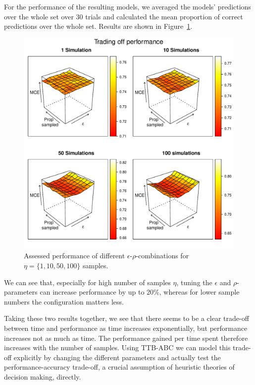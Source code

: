 \documentclass[a4paper,man, natbib]{apa6}
\begin{document}
For the performance of the resulting models, we averaged the models' predictions over the whole set over 30 trials and calculated the mean proportion of correct predictions over the whole set. Results are shown in Figure~\ref{fig:performancetradeoff}.
\begin{figure}[htb!]
  \caption{Assessed performance of different $\epsilon$-$\rho$-combinations for $\eta=\{1,10,50,100\}$ samples.}
\label{fig:performancetradeoff}
  \centering
    \includegraphics[scale=0.6]{figs/performancetradeoff.pdf}
\end{figure}

We can see that, especially for high number of samples $\eta$, tuning the $\epsilon$ and $\rho$-parameters can increase performance by up to 20\%, whereas for lower sample numbers the configuration matters less.

Taking these two results together, we see that there seems to be a clear trade-off between time and performance as time increases exponentially, but performance increases not as much as time. The performance gained per time spent therefore increases with the number of samples. Using TTB-ABC we can model this trade-off explicitly by changing the different parameters and actually test the performance-accuracy trade-off, a crucial assumption of heuristic theories of decision making, directly.
\end{document}

